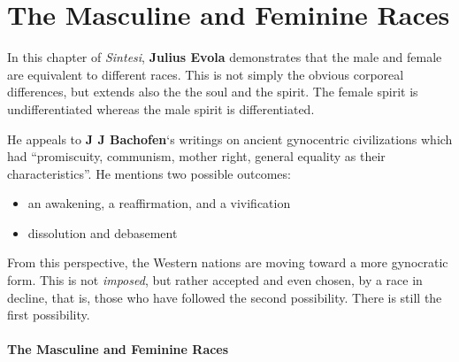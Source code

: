 \section{The Masculine and Feminine Races}

\begin{quotationx}

In this chapter of \textit{Sintesi}, \textbf{Julius Evola} demonstrates that the male and female are equivalent to different races. This is not simply the obvious corporeal differences, but extends also the the soul and the spirit. The female spirit is undifferentiated whereas the male spirit is differentiated.

He appeals to \textbf{J J Bachofen}`s writings on ancient gynocentric civilizations which had ``promiscuity, communism, mother right, general equality as their characteristics''. He mentions two possible outcomes:

\begin{itemize}


\item an awakening, a reaffirmation, and a vivification

\item dissolution and debasement
\end{itemize}


From this perspective, the Western nations are moving toward a more gynocratic form. This is not \emph{imposed}, but rather accepted and even chosen, by a race in decline, that is, those who have followed the second possibility. There is still the first possibility.
\end{quotationx}

\paragraph{The Masculine and Feminine Races}


